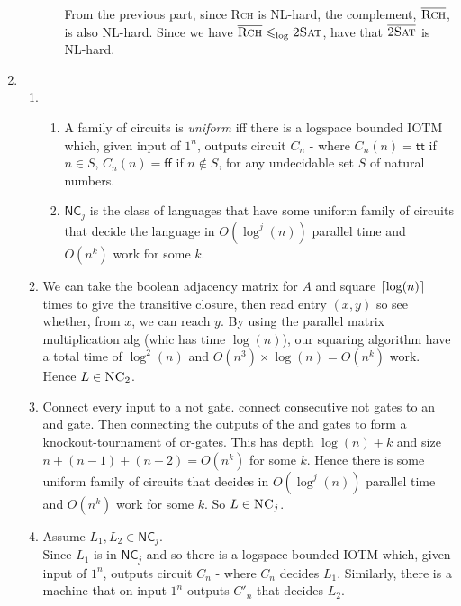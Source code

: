 \documentclass[a4paper, draft, 12pt]{article}
\begin{document}
\begin{enumerate}
\begin{enumerate}
\begin{enumerate}
  From the previous part, since \textsc{Rch} is \textsf{NL}-hard, 
  the complement, $\overline{\textsc{Rch}}$, is also \textsf{NL}-hard. 
  Since we have $\overline{\textsc{Rch}} \leqslant_{\text{log}} \textsc{2Sat}$,
  have that $\overline{\textsc{2Sat}}$ is \textsf{NL}-hard.
  \end{enumerate}
\end{enumerate}
\item %
\begin{enumerate}
\item %
  \begin{enumerate}
  \item %
  A family of circuits is \textit{uniform} iff there is a logspace bounded 
  IOTM which, given input of $1^n$, outputs circuit $C_n$ - where 
  $C_n(n) = \textsf{tt}$ if $n \in S$, $C_n(n) = \textsf{ff}$ if $n \notin S$,
  for any undecidable set $S$ of natural numbers. 
  \item %
  $\textsf{NC}_j$ is the class of languages that have some uniform family of circuits that 
  decide the language in $O(\log^j(n))$ parallel time and $O(n^k)$ work for some $k$.
  \end{enumerate}
\item %
We can take the boolean adjacency matrix for $A$ and square $\lceil\log(n)\rceil$ times to 
give the transitive closure, then read entry $(x,y)$ so see whether, from $x$, 
we can reach $y$. By using the parallel matrix multiplication alg (whic has 
time $\log(n)$), our squaring algorithm have a total time of $\log^2(n)$ and 
$O(n^3) \times \log(n) = O(n^k)$ work. Hence $L \in \textsc{NC}_2$.
\item %
Connect every input to a \textsf{not} gate. 
connect consecutive \textsf{not} gates to an \textsf{and} gate. 
Then connecting the outputs of the \textsf{and} gates to form a knockout-tournament 
of \textsf{or}-gates. 
This has depth $\log(n) + k$ and size $n + (n-1) + (n-2) = O(n^k)$ for some $k$. 
Hence there is some uniform family of circuits that decides 
in $O(\log^j(n))$ parallel time and $O(n^k)$ work for some $k$. 
So $L \in \textsc{NC}_j$.
\item %
Assume $L_1, L_2 \in \textsf{NC}_j$.\\
Since $L_1$ is in $\textsf{NC}_j$ and so there is a logspace bounded 
IOTM which, given input of $1^n$, outputs circuit $C_n$ - where $C_n$
decides $L_1$. Similarly, there is a machine that on input $1^n$ outputs $C'_n$
that decides $L_2$.  


\end{enumerate}
\end{enumerate}
\end{document}
